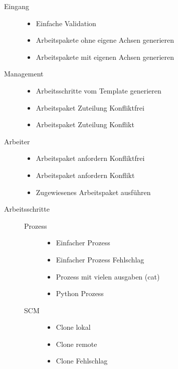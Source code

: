 \begin{description}
    \item[Eingang] \hfill
    \begin{itemize}
        \item Einfache Validation
        \item Arbeitspakete ohne eigene Achsen generieren
        \item Arbeitspakete mit eigenen Achsen generieren
    \end{itemize}
    \item[Management] \hfill
    \begin{itemize}
        \item Arbeitsschritte vom Template generieren
        \item Arbeitspaket Zuteilung Konfliktfrei
        \item Arbeitspaket Zuteilung Konflikt
    \end{itemize}
    \item[Arbeiter] \hfill
    \begin{itemize}
        \item Arbeitspaket anfordern Konfliktfrei
        \item Arbeitspaket anfordern Konflikt
        \item Zugewiesenes Arbeitspaket ausführen
    \end{itemize}
    \item[Arbeitsschritte] \hfill
    \begin{description}
        \item[Prozess] \hfill
        \begin{itemize}
            \item Einfacher Prozess
            \item Einfacher Prozess Fehlschlag
            \item Prozess mit vielen ausgaben (cat)
            \item Python Prozess
        \end{itemize}
        \item[SCM] \hfill
        \begin{itemize}
            \item Clone lokal
            \item Clone remote
            \item Clone Fehlschlag
        \end{itemize}
    \end{description}
\end{description}



